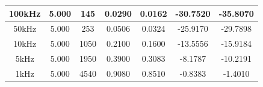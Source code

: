 \documentclass{article}
\begin{document}
\begin{table}[H]
\begin{tabular}{|c|c|c|c|c|c|c|}
	100kHz    & 5.000                                                                        & 145                                                                                & 0.0290                                                                  & 0.0162                                                                             & -30.7520                                                                        & -35.8070                                                                                   \\ \hline
	50kHz     & 5.000                                                                        & 253                                                                                & 0.0506                                                                  & 0.0324                                                                             & -25.9170                                                                        & -29.7898                                                                                   \\ \hline
	10kHz     & 5.000                                                                        & 1050                                                                               & 0.2100                                                                  & 0.1600                                                                             & -13.5556                                                                        & -15.9184                                                                                   \\ \hline
	5kHz      & 5.000                                                                        & 1950                                                                               & 0.3900                                                                  & 0.3083                                                                             & -8.1787                                                                         & -10.2191                                                                                   \\ \hline
	1kHz      & 5.000                                                                        & 4540                                                                               & 0.9080                                                                  & 0.8510                                                                             & -0.8383                                                                         & -1.4010                                                                                    \\ \hline

\end{tabular}
\end{table}
\end{document}
